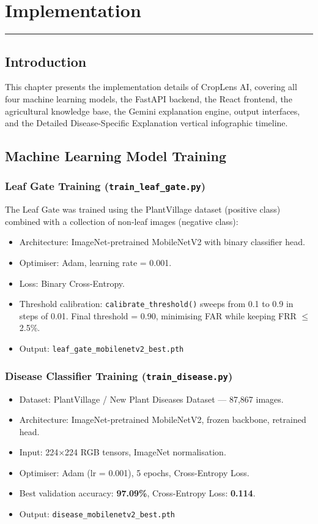 \chapter{Implementation}
\noindent\rule{\linewidth}{2pt}

\section{Introduction}

This chapter presents the implementation details of CropLens AI, covering all four machine learning models, the FastAPI backend, the React frontend, the agricultural knowledge base, the Gemini explanation engine, output interfaces, and the Detailed Disease-Specific Explanation vertical infographic timeline.

\section{Machine Learning Model Training}

\subsection{Leaf Gate Training (\texttt{train\_leaf\_gate.py})}

The Leaf Gate was trained using the PlantVillage dataset (positive class) combined with a collection of non-leaf images (negative class):
\begin{itemize}
    \item Architecture: ImageNet-pretrained MobileNetV2 with binary classifier head.
    \item Optimiser: Adam, learning rate = 0.001.
    \item Loss: Binary Cross-Entropy.
    \item Threshold calibration: \texttt{calibrate\_threshold()} sweeps from 0.1 to 0.9 in steps of 0.01. Final threshold = 0.90, minimising FAR while keeping FRR $\leq$ 2.5\%.
    \item Output: \texttt{leaf\_gate\_mobilenetv2\_best.pth}
\end{itemize}

\subsection{Disease Classifier Training (\texttt{train\_disease.py})}

\begin{itemize}
    \item Dataset: PlantVillage / New Plant Diseases Dataset --- 87,867 images.
    \item Architecture: ImageNet-pretrained MobileNetV2, frozen backbone, retrained head.
    \item Input: 224$\times$224 RGB tensors, ImageNet normalisation.
    \item Optimiser: Adam (lr = 0.001), 5 epochs, Cross-Entropy Loss.
    \item Best validation accuracy: \textbf{97.09\%}, Cross-Entropy Loss: \textbf{0.114}.
    \item Output: \texttt{disease\_mobilenetv2\_best.pth}
\end{itemize}

